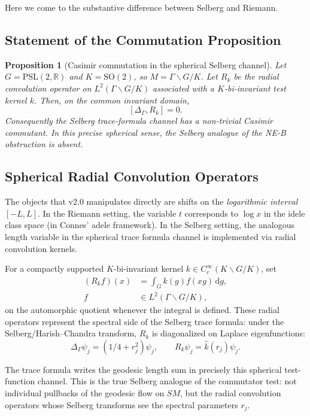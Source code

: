 \documentclass[12pt,a4paper]{article}
\newtheorem{proposition}[theorem]{Proposition}
\theoremstyle{definition}
\theoremstyle{remark}
\newcommand{\RR}{\mathbb{R}}
\newcommand{\Delop}{\Delta_{\Gamma}}
\begin{document}
Here we come to the substantive difference between Selberg and Riemann.

\subsection{Statement of the Commutation Proposition}

\begin{proposition}[Casimir commutation in the spherical Selberg channel]
\label{thm:NEB-fail}
Let $G=\mathrm{PSL}(2,\RR)$ and $K=\mathrm{SO}(2)$, so
$M=\Gamma\backslash G/K$.  Let $R_k$ be the radial convolution operator on
$L^2(\Gamma\backslash G/K)$ associated with a $K$-bi-invariant test kernel
$k$.  Then, on the common invariant domain,
\begin{equation}
\label{eq:NEB-commut}
[\Delop, R_k]=0.
\end{equation}
Consequently the Selberg trace-formula channel has a non-trivial Casimir
commutant.  In this precise spherical sense, the Selberg analogue of the
NE-B obstruction is absent.
\end{proposition}

\subsection{Spherical Radial Convolution Operators}

The objects that v2.0 manipulates directly are shifts on the \emph{logarithmic interval} $[-L,L]$. In the Riemann setting, the variable $t$ corresponds to $\log x$ in the idele class space (in Connes' adele framework). In the Selberg setting, the analogous length variable in the spherical trace formula channel is implemented via radial convolution kernels.

For a compactly supported $K$-bi-invariant kernel $k \in C_c^\infty(K\backslash G/K)$, set
\[
\begin{aligned}
(R_k f)(x) &= \int_G k(g) f(xg)\,\mathrm{d}g, \\
f &\in L^2(\Gamma\backslash G/K),
\end{aligned}
\]
on the automorphic quotient whenever the integral is defined. These radial operators represent the spectral side of the Selberg trace formula: under the Selberg/Harish--Chandra transform, $R_k$ is diagonalized on Laplace eigenfunctions:
\[
\Delop\psi_j = (1/4+r_j^2)\psi_j, \qquad R_k\psi_j = \hat{k}(r_j)\psi_j.
\]

The trace formula writes the geodesic length sum in precisely this spherical test-function channel. This is the true Selberg analogue of the commutator test: not individual pullbacks of the geodesic flow on $SM$, but the radial convolution operators whose Selberg transforms see the spectral parameters $r_j$.
\end{document}

